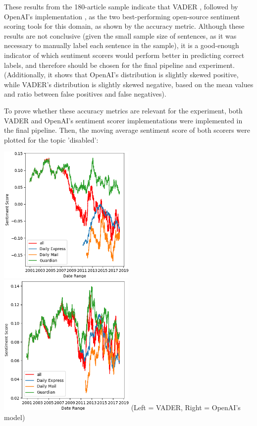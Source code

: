 \documentclass{report}
\begin{document}
These results from the 180-article sample indicate that VADER \cite{VADER}, followed by OpenAI's implementation \cite{OpenAI}, as the two best-performing open-source sentiment scoring tools for this domain, as shown by the accuracy metric.
Although these results are not conclusive (given the small sample size of sentences, as it was necessary to manually label each sentence in the sample), it is a good-enough indicator of which sentiment scorers would perform better in predicting correct labels, and therefore should be chosen for the final pipeline and experiment.
(Additionally, it shows that OpenAI's distribution is slightly skewed positive, while VADER's distribution is slightly skewed negative, based on the mean values and ratio between false positives and false negatives).

To prove whether these accuracy metrics are relevant for the experiment, both VADER and OpenAI's sentiment scorer implementations were implemented in the final pipeline.
Then, the moving average sentiment score of both scorers were plotted for the topic 'disabled':

\noindent
\includegraphics[width=0.5\textwidth]{vader.png}
\includegraphics[width=0.5\textwidth]{openai.png}
(Left = VADER, Right = OpenAI's model)
\vspace{0.5em}
\end{document}
